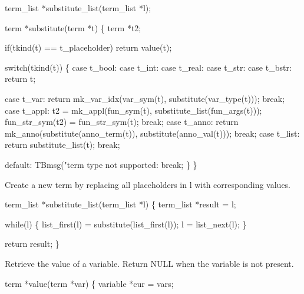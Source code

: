 \nwenddocs{}\endmoddef\let\nwnotused=\nwoutput{}
term_list *substitute_list(term_list *l);

term *substitute(term *t)
\{
  term *t2;

  if(tkind(t) == t_placeholder)
    return value(t);
  
  switch(tkind(t))
  \{
    case t_bool:
    case t_int:
    case t_real:
    case t_str:
    case t_bstr:        return t;


    case t_var:         return mk_var_idx(var_sym(t), substitute(var_type(t)));
                        break;
    case t_appl:        t2 = mk_appl(fun_sym(t), substitute_list(fun_args(t)));
                        fun_str_sym(t2) = fun_str_sym(t);
                        break;
    case t_anno:        return mk_anno(substitute(anno_term(t)), substitute(anno_val(t)));
                        break;
    case t_list:        return substitute_list(t);
                        break;

    default:            TBmsg("term type not supported: %
                        break;
  \}
\}
\nwendcode{}\nwdocspar


Create a new term by replacing all placeholders in l with
corresponding values.

\nwenddocs{}\endmoddef\let\nwnotused=\nwoutput{}
term_list *substitute_list(term_list *l)
\{
  term_list *result = l;

  while(l) \{
    list_first(l) = substitute(list_first(l));
    l = list_next(l);
  \}

  return result;
\}
\nwendcode{}\nwdocspar



Retrieve the value of a variable.
Return NULL when the variable is not present.

\nwenddocs{}\endmoddef\let\nwnotused=\nwoutput{}
term *value(term *var)
\{
  variable *cur = vars;

